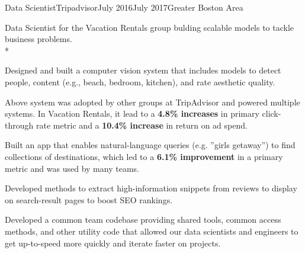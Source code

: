 \documentclass[print]{friggeri-cv} %
\begin{document}
\begin{job}
  {\tripicon}{Data Scientist}{Tripadvisor}{July 2016}{July 2017}{Greater Boston Area}{
    Data Scientist for the Vacation Rentals group bulding scalable models to tackle business problems.\\*
    \begin{myitemize}
      \item Designed and built a computer vision system that includes models to
      detect people, content (e.g., beach, bedroom, kitchen), and rate aesthetic
      quality.

      \item Above system was adopted by other groups at TripAdvisor and powered multiple
      systems. In Vacation Rentals, it lead to a \textbf{4.8\% increases} in primary
      click-through rate metric and a \textbf{10.4\% increase} in return on ad spend.

      \item Built an app that enables natural-language queries (e.g. ”girls getaway”)
      to find collections of destinations, which led to a \textbf{6.1\% improvement} in a
      primary metric and was used by many teams. 

      \item Developed methods to extract high-information snippets from reviews
      to display on search-result pages to boost SEO rankings.

      \item Developed a common team codebase providing shared tools, common
      access methods, and other utility code that allowed our data scientists
      and engineers to get up-to-speed more quickly and iterate faster on
      projects.
    \end{myitemize}
  }
  \end{job}
\end{document}
